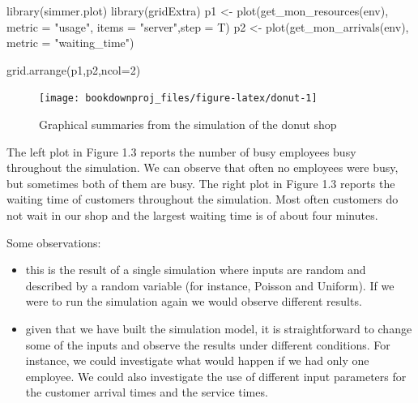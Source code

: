 \documentclass[
]{book}
\newenvironment{Shaded}{\begin{snugshade}}{\end{snugshade}}
\newcommand{\AttributeTok}[1]{\textcolor[rgb]{0.77,0.63,0.00}{#1}}
\newcommand{\DecValTok}[1]{\textcolor[rgb]{0.00,0.00,0.81}{#1}}
\newcommand{\FunctionTok}[1]{\textcolor[rgb]{0.00,0.00,0.00}{#1}}
\newcommand{\NormalTok}[1]{#1}
\newcommand{\OtherTok}[1]{\textcolor[rgb]{0.56,0.35,0.01}{#1}}
\newcommand{\StringTok}[1]{\textcolor[rgb]{0.31,0.60,0.02}{#1}}
\begin{document}
\begin{Shaded}
\begin{Highlighting}[]
\FunctionTok{library}\NormalTok{(simmer.plot)}
\FunctionTok{library}\NormalTok{(gridExtra)}
\NormalTok{p1 }\OtherTok{\textless{}{-}} \FunctionTok{plot}\NormalTok{(}\FunctionTok{get\_mon\_resources}\NormalTok{(env), }\AttributeTok{metric =} \StringTok{"usage"}\NormalTok{, }\AttributeTok{items =} \StringTok{"server"}\NormalTok{,}\AttributeTok{step =}\NormalTok{ T)}
\NormalTok{p2 }\OtherTok{\textless{}{-}} \FunctionTok{plot}\NormalTok{(}\FunctionTok{get\_mon\_arrivals}\NormalTok{(env), }\AttributeTok{metric =} \StringTok{"waiting\_time"}\NormalTok{)}

\FunctionTok{grid.arrange}\NormalTok{(p1,p2,}\AttributeTok{ncol=}\DecValTok{2}\NormalTok{)}
\end{Highlighting}
\end{Shaded}

\begin{figure}

{\centering \texttt{[image: bookdownproj\_files/figure-latex/donut-1]} 

}

\caption{Graphical summaries from the simulation of the donut shop}\label{fig:donut}
\end{figure}

The left plot in Figure 1.3 reports the number of busy employees busy throughout the simulation. We can observe that often no employees were busy, but sometimes both of them are busy. The right plot in Figure 1.3 reports the waiting time of customers throughout the simulation. Most often customers do not wait in our shop and the largest waiting time is of about four minutes.

Some observations:

\begin{itemize}
\item
  this is the result of a single simulation where inputs are random and described by a random variable (for instance, Poisson and Uniform). If we were to run the simulation again we would observe different results.
\item
  given that we have built the simulation model, it is straightforward to change some of the inputs and observe the results under different conditions. For instance, we could investigate what would happen if we had only one employee. We could also investigate the use of different input parameters for the customer arrival times and the service times.
\end{itemize}
\end{document}
